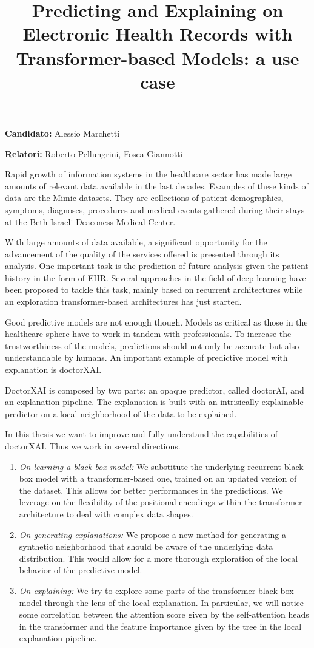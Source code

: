 \documentclass[]{marticle}
\title{\textbf{\huge Predicting and Explaining on Electronic Health Records  with Transformer-based Models: a use case}}
\date{}
\author{}
\begin{document}
\maketitle

\textbf{Candidato:} Alessio Marchetti

\textbf{Relatori:} Roberto Pellungrini, Fosca Giannotti

Rapid growth of information systems in the healthcare sector has made large amounts of relevant data
available in the last decades. Examples of these kinds of data are the Mimic datasets. They are
collections of patient demographics, symptoms, diagnoses, procedures and medical events gathered
during their stays at the Beth Israeli Deaconess Medical Center.

With large amounts of data available, a significant opportunity for the advancement of the quality
of the services offered is presented through its analysis. One important task is the prediction of
future analysis given the patient history in the form of EHR. Several approaches in the field of
deep learning have been proposed to tackle this task, mainly based on recurrent architectures while
an exploration transformer-based architectures has just started.

Good predictive models are not enough though. Models as critical as those in the healthcare sphere
have to work in tandem with professionals. To increase the trustworthiness of the models,
predictions should not only be accurate but also understandable by humans. An important example of
predictive model with explanation is doctorXAI. 

DoctorXAI is composed by two parts: an opaque predictor, called doctorAI, and an explanation
pipeline. The explanation is built with an intrisically explainable predictor on a local
neighborhood of the data to be explained.

In this thesis we want to improve and fully understand the capabilities of doctorXAI. Thus we work
in several directions.
\begin{enumerate}
\item \emph{On learning a black box model:} We substitute the underlying recurrent black-box model
with a transformer-based one, trained on an updated version of the dataset. This allows for better
performances in the predictions. We leverage on the flexibility of the positional encodings within
the transformer architecture to deal with complex data shapes.

\item \emph{On generating explanations:}  We propose a new method for generating a synthetic
neighborhood that should be aware of the underlying data distribution. This would allow for a more
thorough exploration of the local behavior of the predictive model.

\item \emph{On explaining:} We try to explore some parts of the transformer black-box model
through the lens of the local explanation. In particular, we will notice some correlation between the
attention score given by the self-attention heads in the transformer and the feature importance
given by the tree in the local explanation pipeline.
\end{enumerate}
\end{document}
